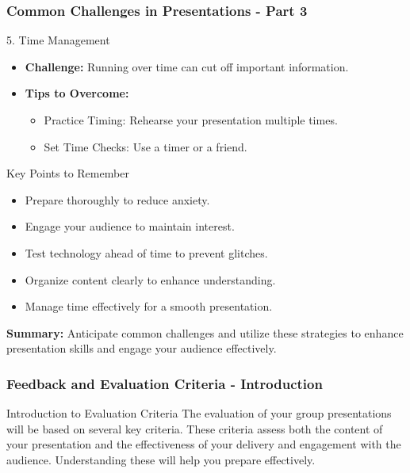 \documentclass[aspectratio=169]{beamer}
\begin{document}
\begin{frame}[fragile]
    \frametitle{Common Challenges in Presentations - Part 3}
    \begin{block}{5. Time Management}
        \begin{itemize}
            \item \textbf{Challenge:} Running over time can cut off important information.
            \item \textbf{Tips to Overcome:}
                \begin{itemize}
                    \item Practice Timing: Rehearse your presentation multiple times.
                    \item Set Time Checks: Use a timer or a friend.
                \end{itemize}
        \end{itemize}
    \end{block}

    \begin{block}{Key Points to Remember}
        \begin{itemize}
            \item Prepare thoroughly to reduce anxiety.
            \item Engage your audience to maintain interest.
            \item Test technology ahead of time to prevent glitches.
            \item Organize content clearly to enhance understanding.
            \item Manage time effectively for a smooth presentation.
        \end{itemize}
    \end{block}
    
    \textbf{Summary:} Anticipate common challenges and utilize these strategies to enhance presentation skills and engage your audience effectively.
\end{frame}

\begin{frame}[fragile]
    \frametitle{Feedback and Evaluation Criteria - Introduction}
    \begin{block}{Introduction to Evaluation Criteria}
        The evaluation of your group presentations will be based on several key criteria. These criteria assess both the content of your presentation and the effectiveness of your delivery and engagement with the audience. Understanding these will help you prepare effectively.
    \end{block}
\end{frame}
\end{document}

